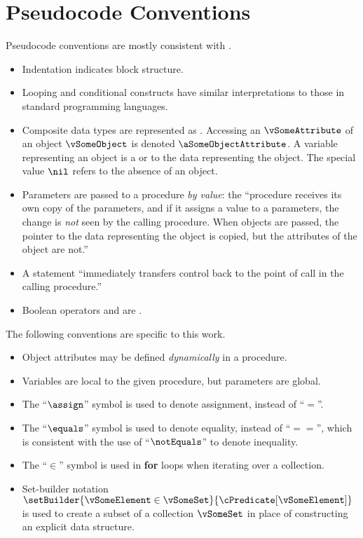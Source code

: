 \chapter{Pseudocode Conventions}\label{ch:pseudocode-conventions}

Pseudocode conventions are mostly consistent with \citet{Cormen2022}.
\begin{itemize}
  \item Indentation indicates block structure.
  \item Looping and conditional constructs have similar interpretations to those in standard programming languages.
  \item Composite data types are represented as . Accessing an  $\vSomeAttribute$ of an object $\vSomeObject$ is denoted
  $\aSomeObjectAttribute$. A variable representing an object is a  or  to the data representing the object. The special value
  $\nil$ refers to the absence of an object.
  \item Parameters are passed to a procedure \emph{by value}: the ``procedure receives its own copy of the parameters, and if it assigns a value to a parameters, the change is \emph{not} seen by the calling procedure. When objects are passed, the pointer to the data representing the object is copied, but the attributes of the object are not.''
  \item A {\Return} statement ``immediately transfers control back to the point of call in the calling procedure.''
  \item Boolean operators {\AND} and {\OR} are .
\end{itemize}
The following conventions are specific to this work.
\begin{itemize}
  \item Object attributes may be defined \emph{dynamically} in a procedure.
  \item Variables are local to the given procedure, but parameters are global.
  \item The ``$\assign$'' symbol is used to denote assignment, instead of ``$=$''.
  \item The ``$\equals$'' symbol is used to denote equality, instead of ``$==$'', which is consistent with the use of ``$\notEquals$'' to denote inequality.
  \item The ``$\in$'' symbol is used in \textbf{for} loops when iterating over a collection.
  \item Set-builder notation $\setBuilder{\vSomeElement \in \vSomeSet}{\cPredicate[\vSomeElement]}$ is used to create a subset of a collection $\vSomeSet$ in place of constructing an explicit data structure.
\end{itemize}